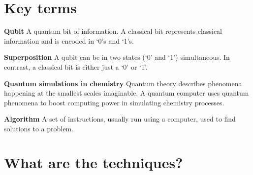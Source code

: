 \documentclass[14pt,landscape,color=UCLdarkred,margin=3cm]{uclposter}
\begin{document}
\begin{multicols}{3}
\begin{figure}[H]
\begin{center}
\begin{minipage}[c]{26em}
  \end{minipage}
  \end{center}

   
\end{figure}


\section*{Key terms}


\begin{highlightbox}
	\textbf{Qubit} A quantum bit of information. A classical bit represents classical information and is encoded in `0's and `1's.
\end{highlightbox}

\begin{highlightbox}
  \textbf{Superposition} A qubit can be in two states (`0' and `1') simultaneous. In contrast, a classical bit is either just a `0' or `1'.
\end{highlightbox}



\begin{highlightbox}
\textbf{Quantum simulations in chemistry} Quantum theory describes phenomena happening at the smallest scales imaginable. A quantum computer uses quantum phenomena to boost computing power in simulating chemistry processes.

\end{highlightbox}

\begin{highlightbox}
\textbf{Algorithm} A set of instructions, usually run using a computer, used to find solutions to a problem. 
\end{highlightbox}

\columnbreak

\section*{What are the techniques?}



\end{multicols}
\end{document}
